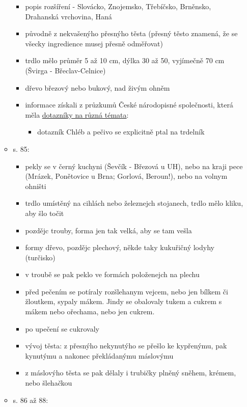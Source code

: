 \begin{itemize}
\begin{itemize}
    \begin{itemize}
    \tightlist
    \item
      popis rozšíření - Slovácko, Znojemsko, Třebíčsko, Brněnsko,
      Drahanská vrchovina, Haná
    \item
      původně z nekvašenýho přesnýho těsta (přesný těsto znamená, že se
      všecky ingredience musej přesně odměřovat)
    \item
      trdlo mělo průměr 5 až 10 cm, dýlka 30 až 50, vyjímečně 70 cm
      (Švirga - Břeclav-Celnice)
    \item
      dřevo březový nebo bukový, nad živým ohněm
    \item
      informace získali z průzkumů České národopisné společnosti, která
      měla
      \href{https://www.narodopisnaspolecnost.cz/index.php/virtualni-badatelna/itemlist/category/31-dotaznikydotazníky\%20na\%20různá\%20témata}{dotazníky
      na různá témata}:

      \begin{itemize}
      \tightlist
      \item
        dotazník Chléb a pečivo se explicitně ptal na trdelník
      \end{itemize}
    \end{itemize}
  \item
    s. 85:

    \begin{itemize}
    \tightlist
    \item
      pekly se v černý kuchyni (Ševčík - Březová u UH), nebo na kraji
      pece (Mrázek, Ponětovice u Brna; Gorlová, Beroun!), nebo na volnym
      ohništi
    \item
      trdlo umístěný na cihlách nebo železnejch stojanech, trdlo mělo
      kliku, aby šlo točit
    \item
      pozdějc trouby, forma jen tak velká, aby se tam vešla
    \item
      formy dřevo, pozdějc plechový, někde taky kukuřičný lodyhy
      (turčisko)
    \item
      v troubě se pak peklo ve formách položenejch na plechu
    \item
      před pečením se potíraly rozšlehanym vejcem, nebo jen bílkem či
      žloutkem, sypaly mákem. Jindy se obalovaly tukem a cukrem s mákem
      nebo ořechama, nebo jen cukrem.
    \item
      po upečení se cukrovaly
    \item
      vývoj těsta: z přesnýho nekynutýho se přešlo ke kypřenýmu, pak
      kynutýmu a nakonec překládanýmu máslovýmu
    \item
      z máslovýho těsta se pak dělaly i trubičky plněný sněhem, krémem,
      nebo šlehačkou
    \end{itemize}
  \item
    s. 86 až 88:


\end{itemize}
\end{itemize}
